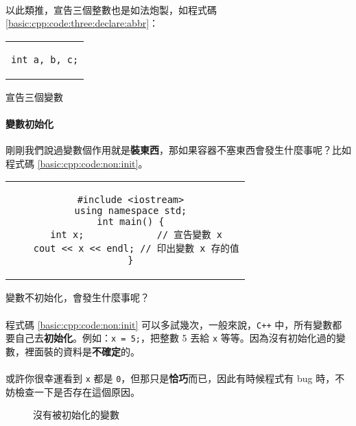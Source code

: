 \documentclass[12pt,a4paper,oneside]{article}
\begin{document}
\begin{CJK}{UTF8}{bkai}
\paragraph{}以此類推，宣告三個整數也是如法炮製，如程式碼 \ref{basic:cpp:code:three:declare:abbr}：
\begin{code}[h!]
\centering
\begin{tabular}{c}
\begin{lstlisting}
int a, b, c;
\end{lstlisting}
\end{tabular}
\caption{宣告三個變數}
\label{basic:cpp:code:three:declare:abbr}
\end{code}

\paragraph{變數初始化}剛剛我們說過變數個作用就是\textbf{裝東西}，那如果容器不塞東西會發生什麼事呢？比如程式碼 \ref{basic:cpp:code:non:init}。

\begin{code}[h!]
\centering
\begin{tabular}{c}
\begin{lstlisting}
  #include <iostream>
  using namespace std;
  int main() {
    int x;             // 宣告變數 x
    cout << x << endl; // 印出變數 x 存的值
  }
\end{lstlisting}
\end{tabular}
\caption{變數不初始化，會發生什麼事呢？}
\label{basic:cpp:code:non:init}
\end{code}

\paragraph{}程式碼 \ref{basic:cpp:code:non:init} 可以多試幾次，一般來說，\texttt{C++} 中，所有變數都要自己去\textbf{初始化}。例如：\lstinline!x = 5;!，把整數 5 丟給 \lstinline!x! 等等。因為沒有初始化過的變數，裡面裝的資料是\textbf{不確定}的。

\paragraph{}或許你很幸運看到 \lstinline!x! 都是 \lstinline!0!，但那只是\textbf{恰巧}而已，因此有時候程式有 bug 時，不妨檢查一下是否存在這個原因。

\begin{figure}[h!]
\centering
{}
\caption{沒有被初始化的變數}
\label{basic:cpp:fig:non:init:variable}
\end{figure}


\end{CJK}
\end{document}
